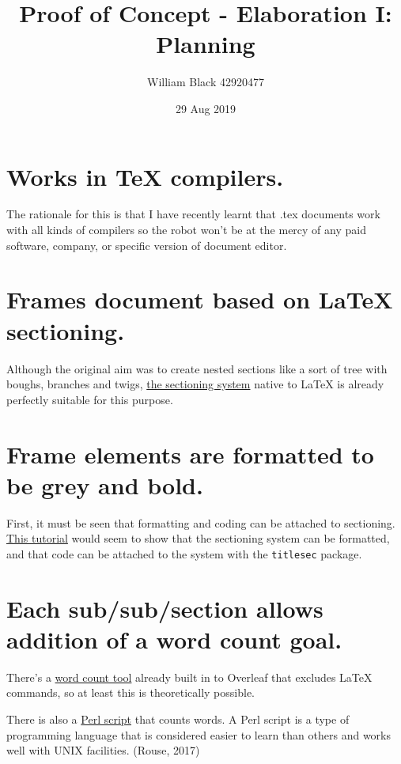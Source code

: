 \documentclass[12pt]{article}
\title{\textbf{Proof of Concept - Elaboration I: Planning}}
\date{29 Aug 2019}
\author{William Black 42920477}
\begin{document}

\section{\large Works in TeX compilers.}

The rationale for this is that I have recently learnt that .tex documents work with all kinds of compilers so the robot won't be at the mercy of any paid software, company, or specific version of document editor.

\section{\large Frames document based on LaTeX sectioning.}

Although the original aim was to create nested sections like a sort of tree with boughs, branches and twigs, \href{https://www.overleaf.com/learn/latex/Sections_and_chapters#Document_Sectioning}{the sectioning system} native to LaTeX is already perfectly suitable for this purpose.

\section{\large Frame elements are formatted to be grey and bold.}

First, it must be seen that formatting and coding can be attached to sectioning. \href{https://www.overleaf.com/learn/latex/Sections_and_chapters#Customize_chapters_and_sections}{This tutorial} would seem to show that the sectioning system can be formatted, and that code can be attached to the system with the \texttt{titlesec} package.

\section{\large Each sub/sub/section allows addition of a word count goal.}

There's a \href{https://www.overleaf.com/learn/how-to/Is_there_a_way_to_run_a_word_count_that_doesn\%27t_include_LaTeX_commands\%3F}{word count tool} already built in to Overleaf that excludes LaTeX commands, so at least this is theoretically possible.

There is also a \href{https://app.uio.no/ifi/texcount/}{Perl script} that counts words. A Perl script is a type of programming language that is considered easier to learn than others and works well with UNIX facilities. (Rouse, 2017)
\end{document}
